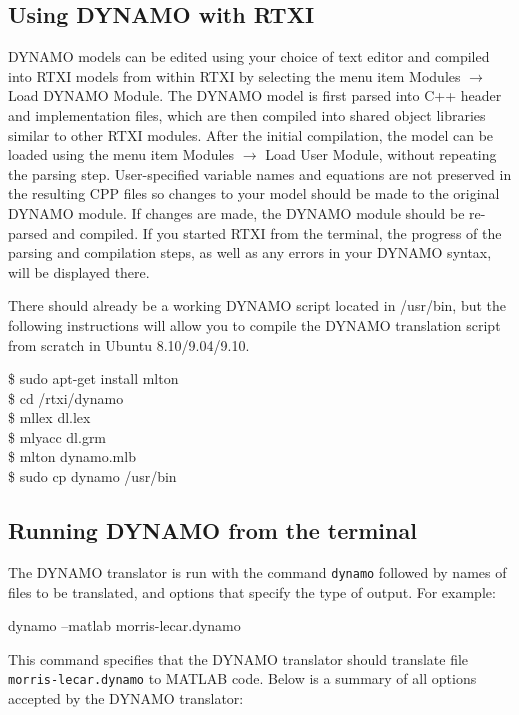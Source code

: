 \subsection{Using DYNAMO with RTXI}

DYNAMO models can be edited using your choice of text editor and compiled into RTXI models from within RTXI by selecting the menu item Modules $\rightarrow$ Load DYNAMO Module. The DYNAMO model is first parsed into C++ header and implementation files, which are then compiled into shared object libraries similar to other RTXI modules. After the initial compilation, the model can be loaded using the menu item Modules $\rightarrow$ Load User Module, without repeating the parsing step. User-specified variable names and equations are not preserved in the resulting CPP files so changes to your model should be made to the original DYNAMO module. If changes are made, the DYNAMO module should be re-parsed and compiled. If you started RTXI from the terminal, the progress of the parsing and compilation steps, as well as any errors in your DYNAMO  syntax, will be displayed there.

There should already be a working DYNAMO script located in /usr/bin, but the following instructions will allow you to compile the DYNAMO translation script from scratch in Ubuntu 8.10/9.04/9.10. 
\begin{example}
\$ sudo apt-get install mlton\\
\$ cd /rtxi/dynamo\\
\$ mllex dl.lex\\
\$ mlyacc dl.grm\\
\$ mlton dynamo.mlb\\
\$ sudo cp dynamo /usr/bin
\end{example}

\subsection{Running DYNAMO from the terminal}

The DYNAMO translator is run with the command \texttt{dynamo} followed by names of files to be translated, and options that specify the type of output. For example:

\begin{example}
  dynamo --matlab  morris-lecar.dynamo
\end{example}

This command specifies that the DYNAMO translator should translate file \texttt{morris-lecar.dynamo} to MATLAB code. Below is a summary of all options accepted by the DYNAMO translator:

